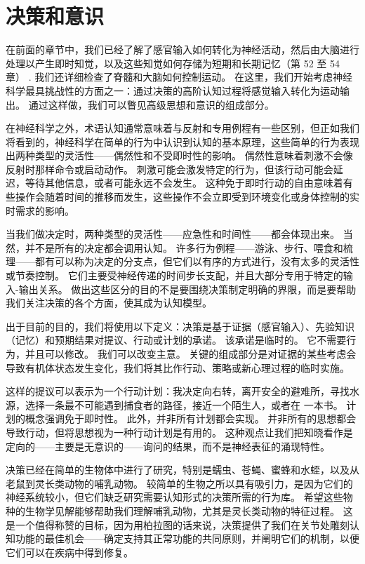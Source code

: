 \chapter{决策和意识}
在前面的章节中，我们已经了解了感官输入如何转化为神经活动，然后由大脑进行处理以产生即时知觉，以及这些知觉如何存储为短期和长期记忆（第 52 至 54 章） . 我们还详细检查了脊髓和大脑如何控制运动。 在这里，我们开始考虑神经科学最具挑战性的方面之一：通过决策的高阶认知过程将感觉输入转化为运动输出。 通过这样做，我们可以瞥见高级思想和意识的组成部分。

在神经科学之外，术语认知通常意味着与反射和专用例程有一些区别，但正如我们将看到的，神经科学在简单的行为中认识到认知的基本原理，这些简单的行为表现出两种类型的灵活性——偶然性和不受即时性的影响。 偶然性意味着刺激不会像反射时那样命令或启动动作。 刺激可能会激发特定的行为，但该行动可能会延迟，等待其他信息，或者可能永远不会发生。 这种免于即时行动的自由意味着有些操作会随着时间的推移而发生，这些操作不会立即受到环境变化或身体控制的实时需求的影响。

当我们做决定时，两种类型的灵活性——应急性和时间性——都会体现出来。 当然，并不是所有的决定都会调用认知。 许多行为例程——游泳、步行、喂食和梳理——都有可以称为决定的分支点，但它们以有序的方式进行，没有太多的灵活性或节奏控制。 它们主要受神经传递的时间步长支配，并且大部分专用于特定的输入-输出关系。 做出这些区分的目的不是要围绕决策制定明确的界限，而是要帮助我们关注决策的各个方面，使其成为认知模型。

出于目前的目的，我们将使用以下定义：决策是基于证据（感官输入）、先验知识（记忆）和预期结果对提议、行动或计划的承诺。 该承诺是临时的。 它不需要行为，并且可以修改。 我们可以改变主意。 关键的组成部分是对证据的某些考虑会导致有机体状态发生变化，我们将其比作行动、策略或新心理过程的临时实施。

这样的提议可以表示为一个行动计划：我决定向右转，离开安全的避难所，寻找水源，选择一条最不可能遇到捕食者的路径，接近一个陌生人，或者在 一本书。 计划的概念强调免于即时性。 此外，并非所有计划都会实现。 并非所有的思想都会导致行动，但将思想视为一种行动计划是有用的。 这种观点让我们把知晓看作是定向的——主要是无意识的——询问的结果，而不是神经表征的涌现特性。

决策已经在简单的生物体中进行了研究，特别是蠕虫、苍蝇、蜜蜂和水蛭，以及从老鼠到灵长类动物的哺乳动物。 较简单的生物之所以具有吸引力，是因为它们的神经系统较小，但它们缺乏研究需要认知形式的决策所需的行为库。 希望这些物种的生物学见解能够帮助我们理解哺乳动物，尤其是灵长类动物的特征过程。 这是一个值得称赞的目标，因为用柏拉图的话来说，决策提供了我们在关节处雕刻认知功能的最佳机会——确定支持其正常功能的共同原则，并阐明它们的机制，以便它们可以在疾病中得到修复。

